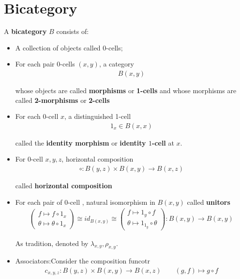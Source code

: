 \documentclass[Total.tex]{subfiles}
\begin{document}
		\section{Bicategory}
			\begin{Def}
				A \textbf{bicategory} $B$ consists of:
				\begin{itemize}
					\item A collection of objects called $0$-cells;
					
					\item For each pair $0$-cells $(x,y)$, a category
					\begin{gather*}
						B(x,y)
					\end{gather*}
					
					whose objects are called \textbf{morphisms} or \textbf{1-cells} and whose morphisms are called \textbf{2-morphisms} or \textbf{2-cells}
					\item For each $0$-cell $x$, a distinguished 1-cell
					\begin{gather*}
						1_x\in B(x,x)
					\end{gather*}
					
					called the \textbf{identity morphism} or \textbf{identity $1$-cell} at $x$.
					\item For 0-cell $x,y,z$, horizontal composition
					\begin{gather*}
						\circ: B(y,z)\times B(x,y)\rightarrow B(x,z)
					\end{gather*}
					
					called \textbf{horizontal composition}
					\item For each pair of $0$-cell , natural isomorphism in $B(x,y)$ called \textbf{unitors}
					\begin{gather*}
						\begin{pmatrix}
							f\mapsto f\circ 1_x\\
							\theta\mapsto \theta\circ 1_x
						\end{pmatrix}\cong id_{B(x,y)}\cong \begin{pmatrix}
							f\mapsto 1_y\circ f\\
							\theta\mapsto1_{1_y}\circ \theta
						\end{pmatrix}:B(x,y)\rightarrow B(x,y)
					\end{gather*}
					
					As tradition, denoted by $\lambda_{x,y},\rho_{x,y}$.
					\item Associators:Consider the composition funcotr
					\begin{gather*}
						c_{x,y,z}:B(y,z)\times B(x,y)\rightarrow B(x,z)\qquad (g,f)\mapsto g\circ f
					\end{gather*}
					

\end{itemize}
\end{Def}
\end{document}

